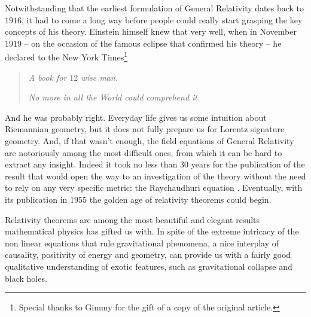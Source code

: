 Notwithstanding that the earliest formulation of General Relativity dates back to \(1916\), it had to come a long way before people could really start grasping the key concepts of his theory. Einstein himself knew that very well, when in November \(1919\) -- on the occasion of the famous eclipse that confirmed his theory -- he declared to the New York Times\footnote{Special thanks to Gimmy for the gift of a copy of the original article.} \cite{nyt:lights-all-askew}
\begin{quote}
    \emph{A book for \(12\) wise man. }
    
    \emph{No more in all the World could comprehend it.}
\end{quote}
And he was probably right. Everyday life gives us some intuition about Riemannian geometry, but it does not fully prepare us for Lorentz signature geometry. And, if that wasn't enough, the field equations of General Relativity are notoriously among the most difficult ones, from which it can be hard to extract any insight. Indeed it took no less than \(30\) years for the publication of the result that would open the way to an investigation of the theory without the need to rely on any very specific metric: the Raychaudhuri equation \cite[]{raychaudhuri1955relativistic}. Eventually, with its publication in \(1955\) the golden age of relativity theorems could begin.

Relativity theorems are among the most beautiful and elegant results mathematical physics has gifted us with. In spite of the extreme intricacy of the non linear equations that rule gravitational phenomena, a nice interplay of causality, positivity of energy and geometry, can provide us with a fairly good qualitative understanding of exotic features, such as gravitational collapse and black holes.

